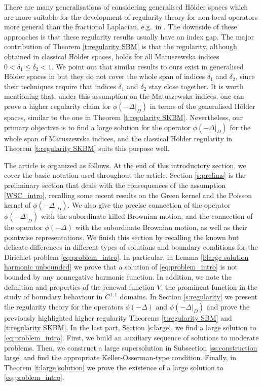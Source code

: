 \documentclass[12pt,a4paper,onecolumn]{amsart}
\theoremstyle{definition}
\newcommand{\1}{\mathbf 1}
\newcommand{\Lo}{\phi(-\left.\Delta\right\vert_{D})}
\newcommand{\LoR}{\phi(-\Delta)}
\numberwithin{equation}{section}
\begin{document}
There are many generalisations of \cite[Proposition 2.8]{Silvestre2007regularity} considering generalised H\"older spaces which are more suitable for the development of regularity theory for non-local operators more general than the fractional Laplacian, e.g.~in \cite{remarks_on_nonlocal,Ros-OtonSerra2016,KKLL,KimLee}. The downside of these approaches is that these regularity results usually have an index gap. The major contribution of Theorem \ref{t:regularity SBM} is that the regularity, although obtained in classical H\"older spaces, holds for all Matuszewska indices $0<\delta_1\le\delta_2<1$. We point out that similar results to ours exist in generalised H\"older spaces in \cite{BaeKassmann,KimLee} but they do not cover the whole span of indices $\delta_1$ and $\delta_2$, since their techniques require that indices $\delta_1$ and $\delta_2$ stay close together. It is worth mentioning that, under this assumption on the Matuszewska indices, one can prove a higher regularity claim for $\Lo$ in terms of the generalised H\"older spaces, similar to the one in Theorem \ref{t:regularity SKBM}. Nevertheless, our primary objective is to find a large solution for the operator $\Lo$ for the whole span of Matuszewska indices, and the classical H\"older regularity in Theorem \ref{t:regularity SKBM} suits this purpose well.



The article is organized as follows. At the end of this introductory section, we cover the basic notation used throughout the article. Section \ref{s:prelims} is the preliminary section that deals with the consequences of the assumption \eqref{WSC_intro}, recalling some recent results on the Green kernel and the Poisson kernel of $\Lo$. We also give the precise connection of the operator $\Lo$ with the subordinate killed Brownian motion, and the connection of the operator $\LoR$ with the subordinate Brownian motion, as well as their pointwise representations. We finish this section by recalling the known but delicate differences in different types of solutions and boundary conditions for the Dirichlet problem \eqref{eq:problem_intro}. In particular, in Lemma \ref{l:large solution harmonic unbounded} we prove that a solution of \eqref{eq:problem_intro} is not bounded by any nonnegative harmonic function. In addition, we note the definition and properties of the renewal function $V$, the prominent function in the study of boundary behaviour in $C^{1,1}$ domains. In Section \ref{s:regularity} we present the regularity theory for the operators $\LoR$ and $\Lo$  and prove the previously highlighted higher regularity Theorems \ref{t:regularity SBM} and \ref{t:regularity SKBM}. In the last part, Section \ref{s:large}, we find a large solution to \eqref{eq:problem_intro}. First, we build an auxiliary sequence of solutions to moderate problems. Then, we construct a large supersolution in Subsection \ref{ss:construction large} and find the appropriate Keller-Osserman-type condition. Finally, in Theorem \ref{t:large solution} we prove the existence of a large solution to \eqref{eq:problem_intro}.
\end{document}
